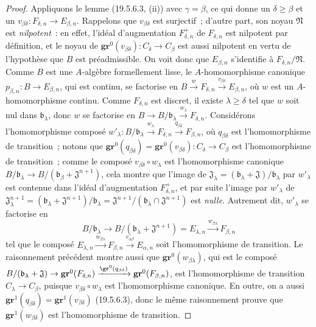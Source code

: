 \begin{proof}
Appliquons le lemme (19.5.6.3, (ii)) avec $\gamma=\beta$, ce qui donne un
$\delta\geq\beta$ et un
$v_{\beta\delta}:F_{\delta,n}\to E_{\beta,n}$. Rappelons que
$v_{\beta\delta}$ est surjectif~; d'autre part, son noyau $\mathfrak N$ est
\emph{nilpotent}~: en effet, l'idéal d'augmentation $F_{\delta,n}^+$ de
$F_{\delta,n}$ est nilpotent par définition, et le noyau de
$\mathbf{gr}^0(v_{\beta\delta}):C_\delta\to C_\beta$ est aussi nilpotent en vertu de
l'hypothèse que $B$ est préadmissible. On voit donc que $E_{\beta,n}$
s'identifie à $F_{\delta,n}/\mathfrak N$. Comme $B$ est une $A$-algèbre
formellement lisse, le $A$-homomorphisme canonique
$p_{\beta,n}:B\to E_{\beta,n}$, qui est continu, se factorise en
$B\xrightarrow{w}F_{\delta,n}\xrightarrow{v_{\beta\delta}}E_{\beta,n}$, où
$w$ est un $A$-homomorphisme continu. Comme $F_{\delta,n}$ est discret, il
existe $\lambda\geq\delta$ tel que $w$ soit nul dans $\mathfrak b_\lambda$,
donc $w$ se factorise en
$B\to B/\mathfrak b_\lambda\xrightarrow{w_\lambda}F_{\delta,n}$. Considérons
l'homomorphisme composé
$w'_\lambda:B/\mathfrak b_\lambda\xrightarrow{w_\lambda}F_{\delta,n}
\xrightarrow{q_{\beta\delta}}F_{\beta,n}$, où $q_{\beta\delta}$ est
l'homomorphisme de transition~; notons que
$\mathbf{gr}^0(q_{\beta\delta})=\mathbf{gr}^0(v_{\beta\delta}):C_\delta\to C_\beta$ est
l'homomorphisme de transition~; comme le composé
$v_{\beta\delta}\circ w_\lambda$ est l'homomorphisme
canonique $B/\mathfrak b_\lambda\to
B/(\mathfrak b_\beta+\mathfrak J^{n+1})$, cela montre que l'image de
$\mathfrak J_\lambda=(\mathfrak b_\lambda+\mathfrak J)/\mathfrak b_\lambda$
par $w'_\lambda$ est contenue dans l'idéal d'augmentation
$F_{\delta,n}^+$, et par suite l'image par $w'_\lambda$ de
$\mathfrak J_\lambda^{n+1}=(\mathfrak b_\lambda+\mathfrak J^{n+1})/
\mathfrak b_\lambda=\mathfrak J^{n+1}/(\mathfrak b_\lambda\cap\mathfrak J^{n+1})$ est \emph{nulle}. Autrement dit,
$w'_\lambda$ se factorise en
\[
  B/\mathfrak b_\lambda\to
  B/(\mathfrak b_\lambda+\mathfrak J^{n+1})=E_{\lambda,n}
  \xrightarrow{w_{\beta\lambda}}F_{\beta,n}
\]
tel que le composé
$E_{\lambda,n}\xrightarrow{w_{\beta\lambda}}F_{\beta,n}
\xrightarrow{v_{\alpha\beta}}E_{\alpha,n}$ soit l'homomorphisme de transition.
Le raisonnement précédent montre aussi que $\mathbf{gr}^0(w_{\beta\lambda})$, qui est
le composé
$B/(\mathfrak b_\lambda+\mathfrak J)\to\mathbf{gr}^0(F_{\delta,n})
\xrightarrow{\gr^0(q_{\beta\delta})}\mathbf{gr}^0(F_{\beta,n})$, est l'homomorphisme
de transition $C_\lambda\to C_\beta$, puisque
$v_{\beta\delta}\circ w_\lambda$ est l'homomorphisme canonique. En outre, on a aussi
$\mathbf{gr}^1(q_{\beta\delta})=\mathbf{gr}^1(v_{\beta\delta})$ (19.5.6.3), donc le même
raisonnement prouve que $\mathbf{gr}^1(w_{\beta\delta})$ est l'homomorphisme de
transition.
\end{proof}

